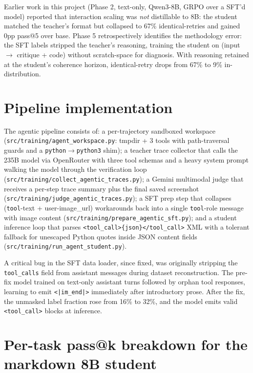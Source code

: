 \documentclass[11pt]{article}
\begin{document}
Earlier work in this project (Phase 2, text-only, Qwen3-8B, GRPO over a SFT'd model) reported that interaction scaling was \emph{not} distillable to 8B: the student matched the teacher's format but collapsed to 67\% identical-retries and gained 0pp pass@5 over base. Phase 5 retrospectively identifies the methodology error: the SFT labels stripped the teacher's reasoning, training the student on (input $\to$ critique + code) without scratch-space for diagnosis. With reasoning retained at the student's coherence horizon, identical-retry drops from 67\% to 9\% in-distribution.

\section{Pipeline implementation}
\label{app:pipeline}

The agentic pipeline consists of: a per-trajectory sandboxed workspace (\texttt{src/training/agent\_workspace.py}: tmpdir + 3 tools with path-traversal guards and a \texttt{python}$\to$\texttt{python3} shim); a teacher trace collector that calls the 235B model via OpenRouter with three tool schemas and a heavy system prompt walking the model through the verification loop (\texttt{src/training/collect\_agentic\_traces.py}); a Gemini multimodal judge that receives a per-step trace summary plus the final saved screenshot (\texttt{src/training/judge\_agentic\_traces.py}); a SFT prep step that collapses (\texttt{tool}-text + user-image\_url) workarounds back into a single \texttt{tool}-role message with image content (\texttt{src/training/prepare\_agentic\_sft.py}); and a student inference loop that parses \texttt{<tool\_call>\{json\}</tool\_call>} XML with a tolerant fallback for unescaped Python quotes inside JSON content fields (\texttt{src/training/run\_agent\_student.py}).

A critical bug in the SFT data loader, since fixed, was originally stripping the \texttt{tool\_calls} field from assistant messages during dataset reconstruction. The pre-fix model trained on text-only assistant turns followed by orphan tool responses, learning to emit \texttt{<|im\_end|>} immediately after introductory prose. After the fix, the unmasked label fraction rose from 16\% to 32\%, and the model emits valid \texttt{<tool\_call>} blocks at inference.

\section{Per-task pass@k breakdown for the markdown 8B student}
\label{app:per-task-md}
\end{document}

